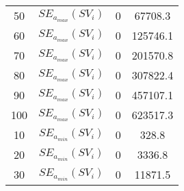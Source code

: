 \begin{table}[H]
\begin{tabular}{cc|cc}
50                                                          & $SE_{a_{max}}(SV_i)$                                                         & 0                                                             & 67708.3                                                               \\
60                                                          & $SE_{a_{max}}(SV_i)$                                                         & 0                                                             & 125746.1                                                              \\
70                                                          & $SE_{a_{max}}(SV_i)$                                                         & 0                                                             & 201570.8                                                              \\
80                                                          & $SE_{a_{max}}(SV_i)$                                                         & 0                                                             & 307822.4                                                              \\
90                                                          & $SE_{a_{max}}(SV_i)$                                                         & 0                                                             & 457107.1                                                              \\
100                                                         & $SE_{a_{max}}(SV_i)$                                                         & 0                                                             & 623517.3                                                              \\
10                                                          & $SE_{a_{min}}(SV_i)$                                                       & 0                                                             & 328.8                                                                 \\
20                                                          & $SE_{a_{min}}(SV_i)$                                                           & 0                                                             & 3336.8                                                                \\
30                                                          & $SE_{a_{min}}(SV_i)$                                                           & 0                                                             & 11871.5                                                               \\

\end{tabular}
\end{table}
